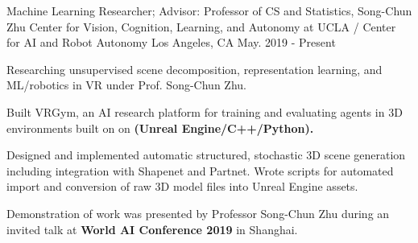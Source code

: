 \cventry
    {Machine Learning Researcher; Advisor: Professor of CS and Statistics, Song-Chun Zhu} %
    {Center for Vision, Cognition, Learning, and Autonomy at UCLA / Center for AI and Robot Autonomy } %
    {Los Angeles, CA} %
    {May. 2019 - Present} %
    {
    \begin{cvitems} %
        \item {Researching unsupervised scene decomposition, representation learning, and ML/robotics in VR under Prof. Song-Chun Zhu.}
        \item {Built VRGym, an AI research platform for training and evaluating agents in
        3D environments built on on \textbf{(Unreal Engine/C++/Python).} } 
        \item {Designed and implemented automatic structured, stochastic 3D scene generation including integration with Shapenet and Partnet. 
        Wrote scripts for automated import and conversion of raw 3D model files into Unreal Engine assets.}
        \item {Demonstration of work was presented by Professor Song-Chun Zhu during an invited talk at \textbf{World AI Conference 2019} in Shanghai.}
    \end{cvitems}
    }